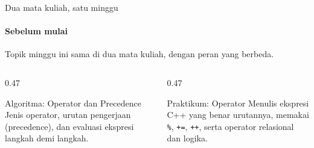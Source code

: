 \documentclass[t]{beamer}
\begin{document}

\begin{frame}{Dua mata kuliah, satu minggu}
\framesubtitle{Sebelum mulai}
Topik minggu ini sama di dua mata kuliah, dengan peran yang berbeda.
\vspace{10pt}

\begin{columns}[T]
\begin{column}{0.47\textwidth}
\begin{Blok}{Algoritma: Operator dan Precedence}
Jenis operator, urutan pengerjaan (precedence), dan evaluasi ekspresi langkah demi langkah.
\end{Blok}
\end{column}
\begin{column}{0.47\textwidth}
\begin{BlokGelap}{Praktikum: Operator}
Menulis ekspresi C++ yang benar urutannya, memakai \texttt{\%}, \texttt{+=}, \texttt{++}, serta operator relasional dan logika.
\end{BlokGelap}
\end{column}
\end{columns}
\end{frame}
\end{document}

